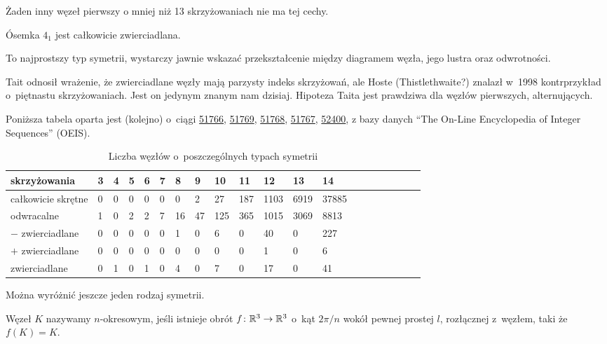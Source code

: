 Żaden inny węzeł pierwszy o mniej niż 13 skrzyżowaniach nie ma tej cechy.

\begin{example}
    Ósemka $4_1$ jest całkowicie zwierciadlana.
\end{example}

To najprostszy typ symetrii, wystarczy jawnie wskazać przekształcenie między diagramem węzła, jego lustra oraz odwrotności.

Tait odnosił wrażenie, że zwierciadlane węzły mają parzysty indeks skrzyżowań,
ale Hoste (Thistlethwaite?) znalazł w~1998 kontrprzykład o~piętnastu skrzyżowaniach.
Jest on jedynym znanym nam dzisiaj.
Hipoteza Taita jest prawdziwa dla węzłów pierwszych, alternujących.

Poniższa tabela oparta jest (kolejno) o~ciągi
\href{https://oeis.org/A051766}{51766},
\href{https://oeis.org/A051769}{51769},
\href{https://oeis.org/A051768}{51768},
\href{https://oeis.org/A051767}{51767},
\href{https://oeis.org/A052400}{52400},
z bazy danych ``The On-Line Encyclopedia of Integer Sequences'' (OEIS).

\begin{table}[h]
    \centering
    \begin{tabular}{@{}*{20}l@{}} \toprule
        skrzyżowania & 3 & 4 & 5 & 6 & 7 & 8 & 9 & 10 & 11 & 12 & 13 & 14 \\ \midrule
        całkowicie skrętne & 0 & 0 & 0 & 0 & 0 & 0 & 2 & 27 & 187 & 1103 & 6919 & 37885 \\
        odwracalne & 1 & 0 & 2 & 2 & 7 & 16 & 47 & 125 & 365 & 1015 & 3069 & 8813 \\
        $-$ zwierciadlane & 0 & 0 & 0 & 0 & 0 & 1 & 0 & 6 & 0 & 40 & 0 & 227 \\
        $+$ zwierciadlane & 0 & 0 & 0 & 0 & 0 & 0 & 0 & 0 & 0 & 1 & 0 & 6 \\
        zwierciadlane & 0 & 1 & 0 & 1 & 0 & 4 & 0 & 7 & 0 & 17 & 0 & 41 \\
        \bottomrule
        \hline
    \end{tabular}
    \caption{Liczba węzłów o~poszczególnych typach symetrii}

\end{table}

Można wyróżnić jeszcze jeden rodzaj symetrii.

\begin{definition}
    \label{def:period}
    Węzeł $K$ nazywamy $n$-okresowym, jeśli istnieje obrót $f \colon \mathbb R^3 \to \mathbb R^3$ o~kąt $2\pi/n$ wokół pewnej prostej $l$, rozłącznej z~węzłem, taki że $f(K) = K$.
\end{definition}

